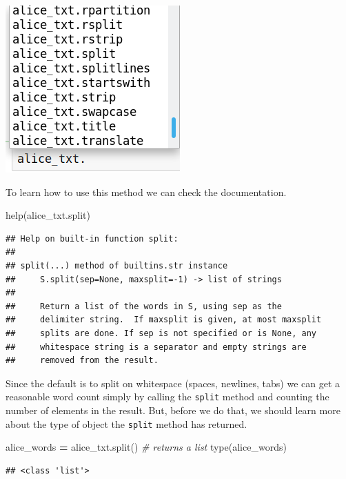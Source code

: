 \documentclass[
]{book}
\newenvironment{Shaded}{\begin{snugshade}}{\end{snugshade}}
\newcommand{\BuiltInTok}[1]{#1}
\newcommand{\CommentTok}[1]{\textcolor[rgb]{0.56,0.35,0.01}{\textit{#1}}}
\newcommand{\NormalTok}[1]{#1}
\newcommand{\OperatorTok}[1]{\textcolor[rgb]{0.81,0.36,0.00}{\textbf{#1}}}
\begin{document}
\includegraphics{Python/PythonIntro/images/notebook_string_completion.png}

To learn how to use this method we can check the documentation.

\begin{Shaded}
\begin{Highlighting}[]
\BuiltInTok{help}\NormalTok{(alice\_txt.split)}
\end{Highlighting}
\end{Shaded}

\begin{verbatim}
## Help on built-in function split:
## 
## split(...) method of builtins.str instance
##     S.split(sep=None, maxsplit=-1) -> list of strings
##     
##     Return a list of the words in S, using sep as the
##     delimiter string.  If maxsplit is given, at most maxsplit
##     splits are done. If sep is not specified or is None, any
##     whitespace string is a separator and empty strings are
##     removed from the result.
\end{verbatim}

Since the default is to split on whitespace (spaces, newlines, tabs) we can get a reasonable word count simply by calling the \texttt{split} method and counting the number of elements in the result. But, before we do that, we should learn more about the type of object the \texttt{split} method has returned.

\begin{Shaded}
\begin{Highlighting}[]
\NormalTok{alice\_words }\OperatorTok{=}\NormalTok{ alice\_txt.split() }\CommentTok{\# returns a list}
\BuiltInTok{type}\NormalTok{(alice\_words)}
\end{Highlighting}
\end{Shaded}

\begin{verbatim}
## <class 'list'>
\end{verbatim}
\end{document}
